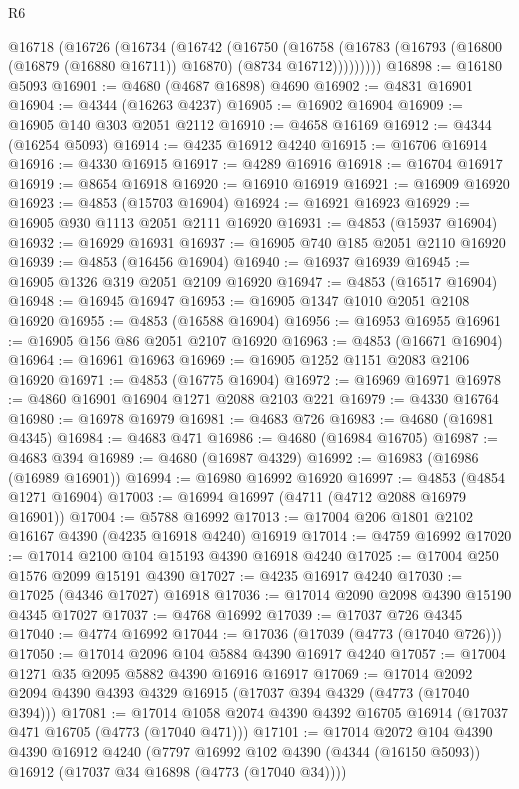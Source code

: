 \begin{lexlean}{R6}
\begin{coremodule}
    @16718
      (@16726
        (@16734
          (@16742
            (@16750
              (@16758
                (@16783 (@16793 (@16800 (@16879 (@16880 @16711)) @16870) (@8734 @16712)))))))))
@16898 := @16180 @5093
@16901 := @4680 (@4687 @16898) @4690
@16902 := @4831 @16901
@16904 := @4344 (@16263 @4237)
@16905 := @16902 @16904
@16909 := @16905 @140 @303 @2051 @2112
@16910 := @4658 @16169
@16912 := @4344 (@16254 @5093)
@16914 := @4235 @16912 @4240
@16915 := @16706 @16914
@16916 := @4330 @16915
@16917 := @4289 @16916
@16918 := @16704 @16917
@16919 := @8654 @16918
@16920 := @16910 @16919
@16921 := @16909 @16920
@16923 := @4853 (@15703 @16904)
@16924 := @16921 @16923
@16929 := @16905 @930 @1113 @2051 @2111 @16920
@16931 := @4853 (@15937 @16904)
@16932 := @16929 @16931
@16937 := @16905 @740 @185 @2051 @2110 @16920
@16939 := @4853 (@16456 @16904)
@16940 := @16937 @16939
@16945 := @16905 @1326 @319 @2051 @2109 @16920
@16947 := @4853 (@16517 @16904)
@16948 := @16945 @16947
@16953 := @16905 @1347 @1010 @2051 @2108 @16920
@16955 := @4853 (@16588 @16904)
@16956 := @16953 @16955
@16961 := @16905 @156 @86 @2051 @2107 @16920
@16963 := @4853 (@16671 @16904)
@16964 := @16961 @16963
@16969 := @16905 @1252 @1151 @2083 @2106 @16920
@16971 := @4853 (@16775 @16904)
@16972 := @16969 @16971
@16978 := @4860 @16901 @16904 @1271 @2088 @2103 @221
@16979 := @4330 @16764
@16980 := @16978 @16979
@16981 := @4683 @726
@16983 := @4680 (@16981 @4345)
@16984 := @4683 @471
@16986 := @4680 (@16984 @16705)
@16987 := @4683 @394
@16989 := @4680 (@16987 @4329)
@16992 := @16983 (@16986 (@16989 @16901))
@16994 := @16980 @16992 @16920
@16997 := @4853 (@4854 @1271 @16904)
@17003 := @16994 @16997 (@4711 (@4712 @2088 @16979 @16901))
@17004 := @5788 @16992
@17013 := @17004 @206 @1801 @2102 @16167 @4390 (@4235 @16918 @4240) @16919
@17014 := @4759 @16992
@17020 := @17014 @2100 @104 @15193 @4390 @16918 @4240
@17025 := @17004 @250 @1576 @2099 @15191 @4390
@17027 := @4235 @16917 @4240
@17030 := @17025 (@4346 @17027) @16918
@17036 := @17014 @2090 @2098 @4390 @15190 @4345 @17027
@17037 := @4768 @16992
@17039 := @17037 @726 @4345
@17040 := @4774 @16992
@17044 := @17036 (@17039 (@4773 (@17040 @726)))
@17050 := @17014 @2096 @104 @5884 @4390 @16917 @4240
@17057 := @17004 @1271 @35 @2095 @5882 @4390 @16916 @16917
@17069 := @17014 @2092 @2094 @4390 @4393 @4329 @16915 (@17037 @394 @4329 (@4773 (@17040 @394)))
@17081 := @17014 @1058 @2074 @4390 @4392 @16705 @16914 (@17037 @471 @16705 (@4773 (@17040 @471)))
@17101 := @17014
    @2072
    @104
    @4390
    @4390
    @16912
    @4240
    (@7797 @16992 @102 @4390 (@4344 (@16150 @5093)) @16912 (@17037 @34 @16898 (@4773 (@17040 @34))))

\end{coremodule}
\end{lexlean}
